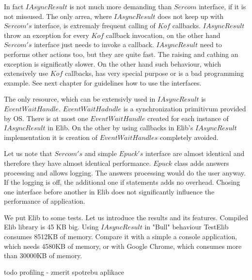 	In fact $IAsyncResult$ is not much more demanding than $Sercom$ interface, if it is not missused.
	The only arrea, where $IAsyncResult$ does not keep up with $Sercom's$ interface, is extremaly frequent calling of $Kof$ callbacks.
	$IAsyncResult$ throw an exception for every $Kof$ callback invocation, on the other hand $Sercom's$ interface just needs to invoke a callback.
	$IAsyncResult$ need to performs other actions too, but they are quite fast. The raising and cathing an exception is significatly slower.
	On the other hand such behaviour, which extensively use $Kof$ callbacks, has very special purpose or is a bad programming example.
	See next chapter for guidelines how to use the interfaces.

	The only resource, which can be extensivly used in $IAsyncResult$ is $EventWaitHandle$. $EventWaitHadndle$ is a synchronization primitivum provided
	by OS. There is at most one $EventWaitHandle$ created for each instance of $IAsyncResult$ in Elib. On the other by using callbacks in Elib's $IAsyncResult$
	implementation it is creation of $EventWaitHandles$ completely avoided.

	Let us note that $Sercom's$ and simple $Epuck's$ interface are almost identical and therefore they have almost identical performance.
	$Epuck$ class adds answers processing and allows logging. The answers processing would do the user anyway. If the logging is off, the additional
	one if statements adds no overhead. 
	Chosing one interface before another in Elib does not significantly influence the performance of application.

	We put Elib to some tests. Let us introduce the results and its features.
	Compiled Elib library is 45 KB big.
	Using $IAsyncResult$ in "Bull" behaviour  TestElib consumes 8512KB of memory.
	Compare it with a simple a console application, which needs 4580KB of memory, or with Google Chrome, which consumes more than 30000KB of memory.

	todo profiling - zmerit spotrebu aplikace	
